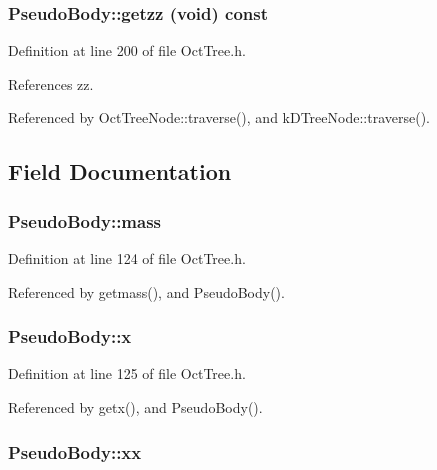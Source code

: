 \subsubsection[{getzz}]{ PseudoBody::getzz (void) const}\label{classPseudoBody_a2d1a834511a1a017c37dfbc04ce3470a}


Definition at line 200 of file OctTree.h.



References zz.



Referenced by OctTreeNode::traverse(), and kDTreeNode::traverse().



\subsection{Field Documentation}
\subsubsection[{mass}]{ {\bf PseudoBody::mass}}\label{classPseudoBody_a677f435d37ab821051acc8782fe87d28}


Definition at line 124 of file OctTree.h.



Referenced by getmass(), and PseudoBody().

\subsubsection[{x}]{ {\bf PseudoBody::x}}\label{classPseudoBody_adfb321836fdd97987e0e9f0d16d888f0}


Definition at line 125 of file OctTree.h.



Referenced by getx(), and PseudoBody().

\subsubsection[{xx}]{ {\bf PseudoBody::xx}}\label{classPseudoBody_a052722090eebdb38fb7a19267dd8b6f0}


